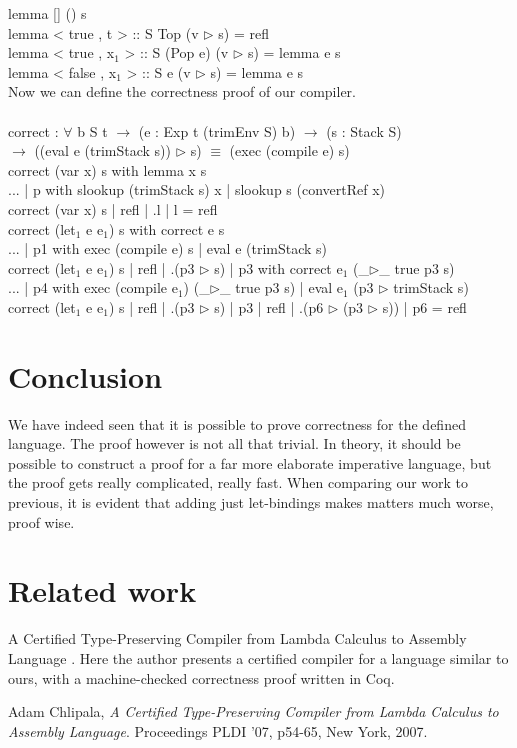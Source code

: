 \documentclass[paper=a4, fontsize=11pt]{scrartcl} %
\numberwithin{equation}{section} %
\numberwithin{figure}{section} %
\numberwithin{table}{section} %
\begin{document}
lemma {[]} () s\\
lemma {< true , t > :: S} Top (v $\rhd$ s) = refl\\
lemma {< true , x$_1$ > :: S} (Pop e) (v $\rhd$ s) = lemma e s\\
lemma {< false , x$_1$ > :: S} e (v $\rhd$ s) = lemma e s\\

\normalfont
Now we can define the correctness proof of our compiler.\\
\ttfamily
\\
correct : $\forall$ {b S t} $\rightarrow$ (e : Exp t (trimEnv S) b) $\rightarrow$ (s : Stack S)\\\hspace*{36mm} $\rightarrow$ ((eval e (trimStack s)) $\rhd$ s) $\equiv$ (exec (compile e) s)\\
correct (var x) s with lemma x s\\
... | p with slookup (trimStack s) x | slookup s (convertRef x) \\
correct (var x) s | refl | .l | l = refl\\
correct (let$_1$ e e$_1$) s with correct e s\\
... | p1 with exec (compile e) s | eval e (trimStack s)\\
correct (let$_1$ e e$_1$) s | refl | .(p3 $\rhd$ s) | p3 with correct e$_1$ (\_$\rhd$\_ {true} p3 s)\\
... | p4 with exec (compile e$_1$) (\_$\rhd$\_ {true} p3 s) | eval e$_1$ (p3 $\rhd$ trimStack s)\\
correct (let$_1$ e e$_1$) s | refl | .(p3 $\rhd$ s) | p3 | refl | .(p6 $\rhd$ (p3 $\rhd$ s)) | p6 = refl\\
\normalfont
\section{Conclusion}
We have indeed seen that it is possible to prove correctness for the defined language. The proof however is not all that trivial. In theory, it should be possible to construct a proof for a far more elaborate imperative language, but the proof gets really complicated, really fast. When comparing our work to previous, it is evident that adding just let-bindings makes matters much worse, proof wise.
\section{Related work} %
A Certified Type-Preserving Compiler from Lambda Calculus to
Assembly Language \cite{Chlipala}. Here the author presents a certified compiler for a language similar to ours, with a machine-checked correctness proof written in Coq.

\begin{thebibliography}{9}
	Adam Chlipala,
  	\emph{A Certified Type-Preserving Compiler from Lambda Calculus to
Assembly Language}.
  	Proceedings PLDI '07, p54-65, New York, 2007.
	
\end{thebibliography}
\end{document}
